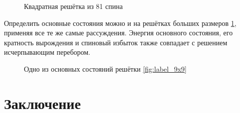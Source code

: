 \documentclass[utf8, babel, sor, jor, amsmath, amssymb, reprint]{elsarticle} %
\begin{document}
\begin{figure}[h]
	\centering
	\caption{Квадратная решётка из 81 спина}
	\label{fig:label_9x9}
\end{figure}



Определить основные состояния можно и на решётках больших размеров \ref{fig:label_9x9}, применяя все те же самые рассуждения. Энергия основного состояния, его кратность вырождения и спиновый избыток также совпадает с решением исчерпывающим перебором.

\begin{figure}[h]
	\centering
	\caption{Одно из основных состояний решётки \eqref{fig:label_9x9}}
	\label{fig:label_9x9_gs_1}
\end{figure}



\section{Заключение}
\end{document}
